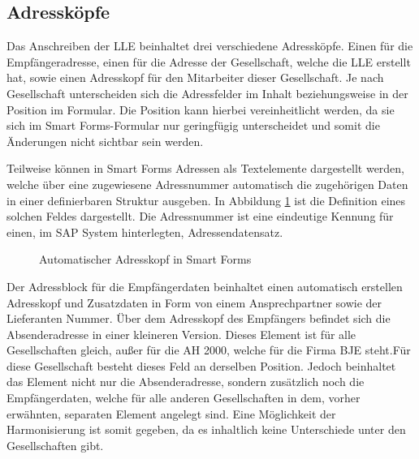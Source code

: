 	\subsection{Adressköpfe}
	\label{ist:adr}
	
	Das Anschreiben der \ac{LLE} beinhaltet drei verschiedene Adressköpfe. Einen für die Empfängeradresse, einen für die Adresse der Gesellschaft, welche die \ac{LLE} erstellt hat, sowie einen Adresskopf für den Mitarbeiter dieser Gesellschaft. Je nach Gesellschaft unterscheiden sich die Adressfelder im Inhalt beziehungsweise in der Position im Formular. Die Position kann hierbei vereinheitlicht werden, da sie sich im Smart Forms-Formular nur geringfügig unterscheidet und somit die Änderungen nicht sichtbar sein werden. 
	
	Teilweise können in Smart Forms Adressen als Textelemente dargestellt werden, welche über eine zugewiesene Adressnummer automatisch die zugehörigen Daten in einer definierbaren Struktur ausgeben. In Abbildung \ref{auto} ist die Definition eines solchen Feldes dargestellt. Die Adressnummer ist eine eindeutige Kennung für einen, im SAP System hinterlegten, Adressendatensatz.
			\begin{figure}[ht]
			\centering
			\caption{Automatischer Adresskopf in Smart Forms}
			\label{auto}
		\end{figure} 
	\FloatBarrier
	
	 Der Adressblock für die Empfängerdaten beinhaltet einen automatisch erstellen Adresskopf und Zusatzdaten in Form von einem Ansprechpartner sowie der Lieferanten Nummer. Über dem Adresskopf des Empfängers befindet sich die Absenderadresse in einer kleineren Version. Dieses Element ist für alle Gesellschaften gleich, außer für die \ac{AH} 2000, welche für die Firma \ac{BJE} steht.Für diese Gesellschaft besteht dieses Feld an derselben Position. Jedoch beinhaltet das Element nicht nur die Absenderadresse, sondern zusätzlich noch die Empfängerdaten, welche für alle anderen Gesellschaften in dem, vorher erwähnten, separaten Element angelegt sind. Eine Möglichkeit der Harmonisierung ist somit gegeben, da es inhaltlich keine Unterschiede unter den Gesellschaften gibt.
	
